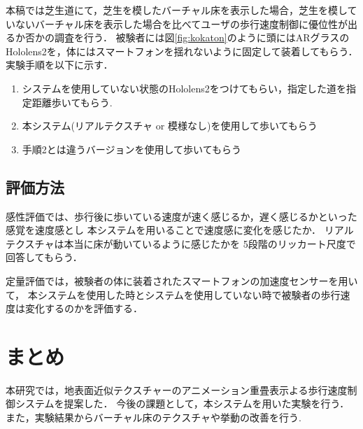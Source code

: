 \documentclass[dvipdfmx]{jsarticle}
\begin{document}
本稿では芝生道にて，芝生を模したバーチャル床を表示した場合，芝生を模していないバーチャル床を表示した場合を比べてユーザの歩行速度制御に優位性が出るか否かの調査を行う．
被験者には図\ref{fig:kokaton}のように頭にはARグラスのHololens2を，体にはスマートフォンを揺れないように固定して装着してもらう．
実験手順を以下に示す．
\begin{enumerate}
    \item システムを使用していない状態のHololens2をつけてもらい，指定した道を指定距離歩いてもらう.
    \item 本システム(リアルテクスチャ or 模様なし)を使用して歩いてもらう
    \item 手順2とは違うバージョンを使用して歩いてもらう
\end{enumerate}

 \subsection{評価方法}
 感性評価では、歩行後に歩いている速度が速く感じるか，遅く感じるかといった感覚を速度感とし
 本システムを用いることで速度感に変化を感じたか．
 リアルテクスチャは本当に床が動いているように感じたかを
 5段階のリッカート尺度で回答してもらう．


 定量評価では，被験者の体に装着されたスマートフォンの加速度センサーを用いて，
 本システムを使用した時とシステムを使用していない時で被験者の歩行速度は変化するのかを評価する．

\section{まとめ}
本研究では，地表面近似テクスチャーのアニメーション重畳表示よる歩行速度制御システムを提案した．
今後の課題として，本システムを用いた実験を行う．
また，実験結果からバーチャル床のテクスチャや挙動の改善を行う.


\end{document}
